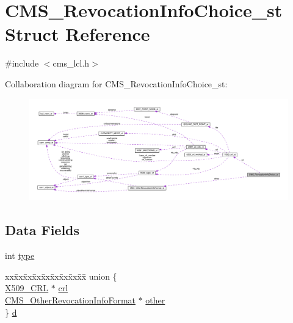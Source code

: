 \hypertarget{struct_c_m_s___revocation_info_choice__st}{}\section{C\+M\+S\+\_\+\+Revocation\+Info\+Choice\+\_\+st Struct Reference}
\label{struct_c_m_s___revocation_info_choice__st}


{\ttfamily \#include $<$cms\+\_\+lcl.\+h$>$}



Collaboration diagram for C\+M\+S\+\_\+\+Revocation\+Info\+Choice\+\_\+st\+:\nopagebreak
\begin{figure}[H]
\begin{center}
\leavevmode
\includegraphics[width=350pt]{struct_c_m_s___revocation_info_choice__st__coll__graph}
\end{center}
\end{figure}
\subsection*{Data Fields}
\begin{DoxyCompactItemize}
\item 
int \hyperlink{struct_c_m_s___revocation_info_choice__st_ac765329451135abec74c45e1897abf26}{type}
\item 
\begin{tabbing}
xx\=xx\=xx\=xx\=xx\=xx\=xx\=xx\=xx\=\kill
union \{\\
\>\hyperlink{crypto_2ossl__typ_8h_ac8661d2485c2c8da5fd7dd26b846f4bf}{X509\_CRL} $\ast$ \hyperlink{struct_c_m_s___revocation_info_choice__st_a34fe84e0f1ecba5f97d6b22eded9c633}{crl}\\
\>\hyperlink{cms__lcl_8h_a8a7037a68100a105c28714cb7167220e}{CMS\_OtherRevocationInfoFormat} $\ast$ \hyperlink{struct_c_m_s___revocation_info_choice__st_a720950b458829769c5f14991524b04d5}{other}\\
\} \hyperlink{struct_c_m_s___revocation_info_choice__st_ac6a0c178d856eb2089186f1b77d26c72}{d}\\

\end{tabbing}\end{DoxyCompactItemize}


